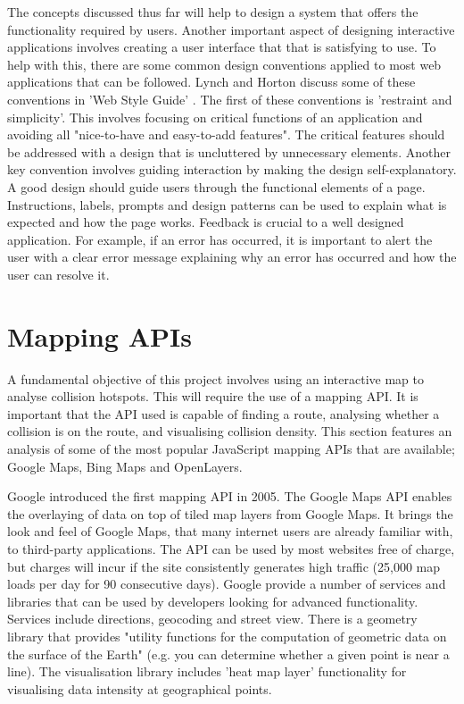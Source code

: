 \documentclass[authoryearcitations]{UoYCSproject}
\begin{document}
The concepts discussed thus far will help to design a system that offers the functionality required by users. Another important aspect of designing interactive applications involves creating a user interface that that is satisfying to use. To help with this, there are some common design conventions applied to most web applications that can be followed. Lynch and Horton discuss some of these conventions in 'Web Style Guide' \citep{Lynch2009}. The first of these conventions is 'restraint and simplicity'. This involves focusing on critical functions of an application and avoiding all "nice-to-have and easy-to-add features". The critical features should be addressed with a design that is uncluttered by unnecessary elements. Another key convention involves guiding interaction by making the design self-explanatory. A good design should guide users through the functional elements of a page. Instructions, labels, prompts and design patterns can be used to explain what is expected and how the page works. Feedback is crucial to a well designed application. For example, if an error has occurred, it is important to alert the user with a clear error message explaining why an error has occurred and how the user can resolve it. 

\section{Mapping APIs}

A fundamental objective of this project involves using an interactive map to analyse collision hotspots. This will require the use of a mapping API. It is important that the API used is capable of finding a route, analysing whether a collision is on the route, and visualising collision density. This section features an analysis of some of the most popular JavaScript mapping APIs that are available; Google Maps, Bing Maps and OpenLayers.  

Google introduced the first mapping API in 2005. The Google Maps API \citep{Google} enables the overlaying of data on top of tiled map layers from Google Maps. It brings the look and feel of Google Maps, that many internet users are already familiar with, to third-party applications. The API can be used by most websites free of charge, but charges will incur if the site consistently generates high traffic (25,000 map loads per day for 90 consecutive days). Google provide a number of services and libraries that can be used by developers looking for advanced functionality. Services include directions, geocoding and street view. There is a geometry library that provides "utility functions for the computation of geometric data on the surface of the Earth" (e.g. you can determine whether a given point is near a line). The visualisation library includes 'heat map layer' functionality for visualising data intensity at geographical points.
\end{document}

